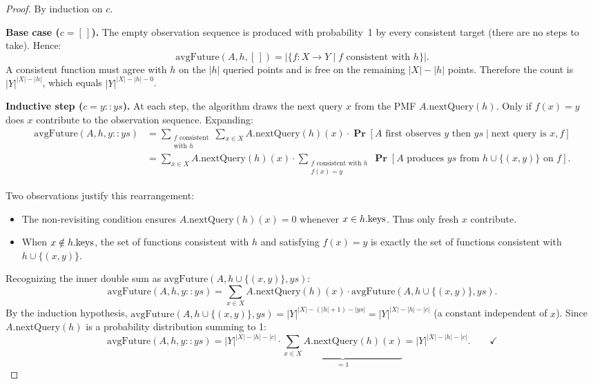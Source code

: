 \documentclass[11pt]{article}
\theoremstyle{remark}
\DeclareMathOperator{\Prob}{\mathbf{Pr}}
\newcommand{\avgFuture}{\mathrm{avgFuture}}
\newcommand{\card}[1]{|#1|}
\begin{document}
\begin{proof}
By induction on $c$.

\medskip
\noindent\textbf{Base case ($c = [\,]$).}
The empty observation sequence is produced with probability~1 by every
consistent target (there are no steps to take).  Hence:
\[
  \avgFuture(A, h, [\,])
  = \card{\{f : X \to Y \mid f \text{ consistent with } h\}}.
\]
A consistent function must agree with $h$ on the $\card{h}$ queried
points and is free on the remaining $\card{X} - \card{h}$ points.
Therefore the count is $\card{Y}^{\card{X} - \card{h}}$, which equals
$\card{Y}^{\card{X} - \card{h} - 0}$. \checkmark

\medskip
\noindent\textbf{Inductive step ($c = y :: ys$).}
At each step, the algorithm draws the next query $x$ from the PMF
$A.\mathrm{nextQuery}(h)$.  Only if $f(x) = y$ does $x$ contribute to
the observation sequence.  Expanding:
\begin{align*}
  \avgFuture(A, h, y :: ys)
  &= \sum_{\substack{f \text{ consistent} \\ \text{with } h}}
       \sum_{x \in X}
         A.\mathrm{nextQuery}(h)(x)
         \cdot
         \Prob[A \text{ first observes } y \text{ then } ys
               \mid \text{next query is } x, f]
  \\
  &= \sum_{x \in X}
       A.\mathrm{nextQuery}(h)(x)
       \cdot
       \sum_{\substack{f \text{ consistent with } h \\ f(x) = y}}
         \Prob[A \text{ produces } ys \text{ from } h \cup \{(x,y)\} \text{ on } f].
\end{align*}

Two observations justify this rearrangement:
\begin{itemize}
  \item The non-revisiting condition ensures
        $A.\mathrm{nextQuery}(h)(x) = 0$ whenever $x \in h.{\rm keys}$.
        Thus only fresh $x$ contribute.
  \item When $x \notin h.{\rm keys}$, the set of functions consistent
        with $h$ and satisfying $f(x) = y$ is exactly the set of
        functions consistent with $h \cup \{(x, y)\}$.
\end{itemize}

Recognizing the inner double sum as $\avgFuture(A, h \cup \{(x,y)\},
ys)$:
\[
  \avgFuture(A, h, y :: ys)
  = \sum_{x \in X}
      A.\mathrm{nextQuery}(h)(x) \cdot \avgFuture(A, h \cup \{(x,y)\}, ys).
\]
By the induction hypothesis, $\avgFuture(A, h \cup \{(x,y)\}, ys) =
\card{Y}^{\card{X} - (\card{h}+1) - \card{ys}} = \card{Y}^{\card{X} -
\card{h} - \card{c}}$ (a constant independent of $x$).  Since
$A.\mathrm{nextQuery}(h)$ is a probability distribution summing to 1:
\[
  \avgFuture(A, h, y :: ys)
  = \card{Y}^{\card{X} - \card{h} - \card{c}}
    \cdot \underbrace{\sum_{x \in X} A.\mathrm{nextQuery}(h)(x)}_{= 1}
  = \card{Y}^{\card{X} - \card{h} - \card{c}}. \qquad \checkmark
\]
\end{proof}
\end{document}
